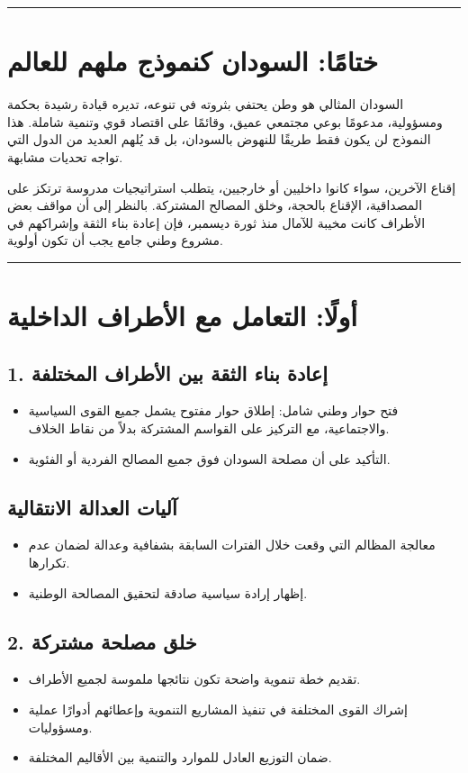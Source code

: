\documentclass[12pt]{article}
\begin{document}
\hrule

\section{ختامًا: السودان كنموذج ملهم للعالم}
السودان المثالي هو وطن يحتفي بثروته في تنوعه، تديره قيادة رشيدة بحكمة ومسؤولية، مدعومًا بوعي مجتمعي عميق، وقائمًا على اقتصاد قوي وتنمية شاملة. هذا النموذج لن يكون فقط طريقًا للنهوض بالسودان، بل قد يُلهم العديد من الدول التي تواجه تحديات مشابهة. 

إقناع الآخرين، سواء كانوا داخليين أو خارجيين، يتطلب استراتيجيات مدروسة ترتكز على المصداقية، الإقناع بالحجة، وخلق المصالح المشتركة. بالنظر إلى أن مواقف بعض الأطراف كانت مخيبة للآمال منذ ثورة ديسمبر، فإن إعادة بناء الثقة وإشراكهم في مشروع وطني جامع يجب أن تكون أولوية.

\hrule

\section{أولًا: التعامل مع الأطراف الداخلية}
\subsection{1. إعادة بناء الثقة بين الأطراف المختلفة}
\begin{itemize}
    \item فتح حوار وطني شامل: إطلاق حوار مفتوح يشمل جميع القوى السياسية والاجتماعية، مع التركيز على القواسم المشتركة بدلاً من نقاط الخلاف.
    \item التأكيد على أن مصلحة السودان فوق جميع المصالح الفردية أو الفئوية.
\end{itemize}

\subsection{آليات العدالة الانتقالية}
\begin{itemize}
    \item معالجة المظالم التي وقعت خلال الفترات السابقة بشفافية وعدالة لضمان عدم تكرارها.
    \item إظهار إرادة سياسية صادقة لتحقيق المصالحة الوطنية.
\end{itemize}

\subsection{2. خلق مصلحة مشتركة}
\begin{itemize}
    \item تقديم خطة تنموية واضحة تكون نتائجها ملموسة لجميع الأطراف.
    \item إشراك القوى المختلفة في تنفيذ المشاريع التنموية وإعطائهم أدوارًا عملية ومسؤوليات.
    \item ضمان التوزيع العادل للموارد والتنمية بين الأقاليم المختلفة.
\end{itemize}
\end{document}
